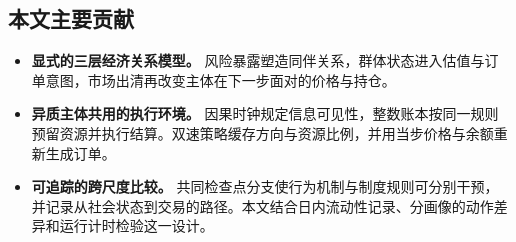 \subsection{本文主要贡献}
\label{sec:contributions_zh}

\begin{itemize}[leftmargin=*,itemsep=2pt]
 \item \textbf{显式的三层经济关系模型。} 风险暴露塑造同伴关系，群体状态进入估值与订单意图，市场出清再改变主体在下一步面对的价格与持仓。
 \item \textbf{异质主体共用的执行环境。} 因果时钟规定信息可见性，整数账本按同一规则预留资源并执行结算。双速策略缓存方向与资源比例，并用当步价格与余额重新生成订单。
 \item \textbf{可追踪的跨尺度比较。} 共同检查点分支使行为机制与制度规则可分别干预，并记录从社会状态到交易的路径。本文结合日内流动性记录、分画像的动作差异和运行计时检验这一设计。
\end{itemize}
